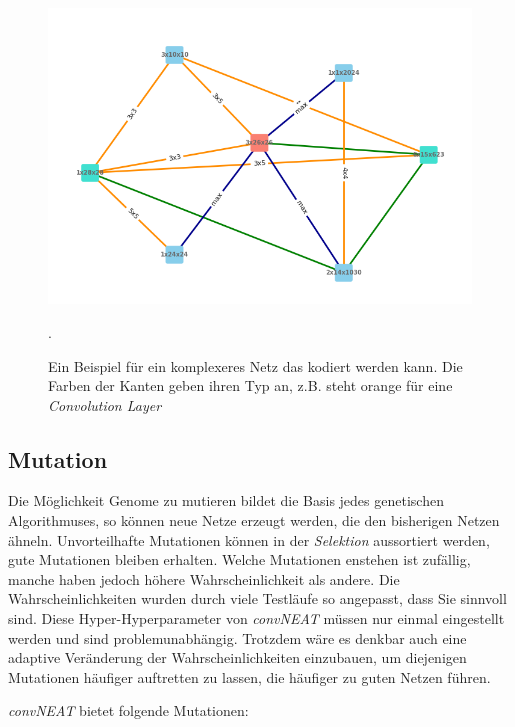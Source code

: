 \documentclass[]{scrartcl}
\begin{document}
			\begin{figure}[h]
				\centering
				\includegraphics[scale=0.7]{img/net2.png}
				\caption{Ein Beispiel für ein komplexeres Netz das kodiert werden kann. Die Farben der Kanten geben ihren Typ an, z.B. steht orange für eine \textit{Convolution Layer}}.
			\end{figure}

		\subsection{Mutation}

			Die Möglichkeit Genome zu mutieren bildet die Basis jedes genetischen Algorithmuses, so können neue Netze erzeugt werden, die den
			bisherigen Netzen ähneln. Unvorteilhafte Mutationen können in der \textit{Selektion} aussortiert werden, gute Mutationen bleiben erhalten.
			Welche Mutationen enstehen ist zufällig, manche haben jedoch höhere Wahrscheinlichkeit als andere.
			Die Wahrscheinlichkeiten wurden durch viele Testläufe so angepasst, dass Sie sinnvoll sind.
			Diese Hyper-Hyperparameter von \textit{convNEAT} müssen nur einmal eingestellt werden und sind problemunabhängig.
			Trotzdem wäre es denkbar auch eine adaptive Veränderung der Wahrscheinlichkeiten einzubauen, um diejenigen Mutationen häufiger auftretten zu lassen,
			die häufiger zu guten Netzen führen.

			\textit{convNEAT} bietet folgende Mutationen:
\end{document}
